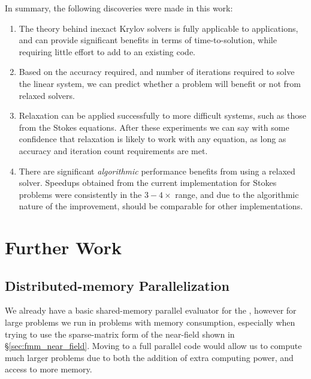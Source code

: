 In summary, the following discoveries were made in this work:
\begin{enumerate}
\item The theory behind inexact Krylov solvers is fully applicable to {\fmmbem} applications, and can provide significant benefits in terms of time-to-solution, while requiring little effort to add to an existing {\fmmbem} code.

\item Based on the accuracy required, and number of iterations required to solve the linear system, we can predict whether a problem will benefit or not from relaxed solvers.

\item Relaxation can be applied successfully to more difficult systems, such as those from the Stokes equations. After these experiments we can say with some confidence that relaxation is likely to work with any equation, as long as accuracy and iteration count requirements are met.

\item There are significant \emph{algorithmic} performance benefits from using a relaxed solver. Speedups obtained from the current implementation for Stokes problems were consistently in the $3-4\times$ range, and due to the algorithmic nature of the improvement, should be comparable for other implementations.
\end{enumerate}

\section{Further Work}


\subsection{Distributed-memory Parallelization}

We already have a basic shared-memory parallel evaluator for the {\fmmbem}, however for large problems we run in problems with memory consumption, especially when trying to use the sparse-matrix form of the near-field shown in \S\ref{sec:fmm_near_field}. Moving to a full parallel code would allow us to compute much larger problems due to both the addition of extra computing power, and access to more memory.

